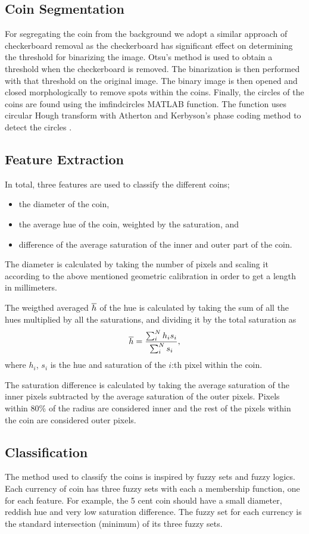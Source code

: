 \documentclass[report.tex]{subfile}
\begin{document}
\subsection{Coin Segmentation}
For segregating the coin from the background we adopt a similar approach of
checkerboard removal as the checkerboard has significant effect on determining
the threshold for binarizing the image. Otsu's method is used to obtain a
threshold when the checkerboard is removed. The binarization is then performed
with that threshold on the original image. The binary image is then opened and
closed morphologically to remove spots within the coins. Finally, the circles
of the coins are found using the imfindcircles MATLAB function. The function
uses circular Hough transform with Atherton and Kerbyson's phase coding method
to detect the circles \cite{matlab-imfindcircles}.

\subsection{Feature Extraction}
In total, three features are used to classify the different coins;
\begin{itemize}
    \item the diameter of the coin,
    \item the average hue of the coin, weighted by the saturation, and
    \item difference of the average saturation of the inner and outer part of
        the coin.
\end{itemize}
The diameter is calculated by taking the number of pixels and scaling it
according to the above mentioned geometric calibration in order to get a length
in millimeters.

The weigthed averaged $\overline{h}$ of the hue is calculated by taking the sum of
all the hues multiplied by all the saturations, and dividing it by the total
saturation as
\begin{equation*}
    \overline{h} = \frac{\sum_i^N h_i s_i}{\sum_i^N s_i},
\end{equation*}
where $h_i$, $s_i$ is the hue and saturation of the $i$:th pixel within the
coin.

The saturation difference is calculated by taking the average saturation of the
inner pixels subtracted by the average saturation of the outer pixels. Pixels
within 80\% of the radius are considered inner and the rest of the pixels
within the coin are considered outer pixels.

\subsection{Classification}
The method used to classify the coins is inspired by fuzzy sets and fuzzy
logics. Each currency of coin has three fuzzy sets with each a membership
function, one for each feature. For example, the 5 cent coin should have a
small diameter, reddish hue and very low saturation difference. The fuzzy set
for each currency is the standard intersection (minimum) of its three fuzzy
sets.
\end{document}
